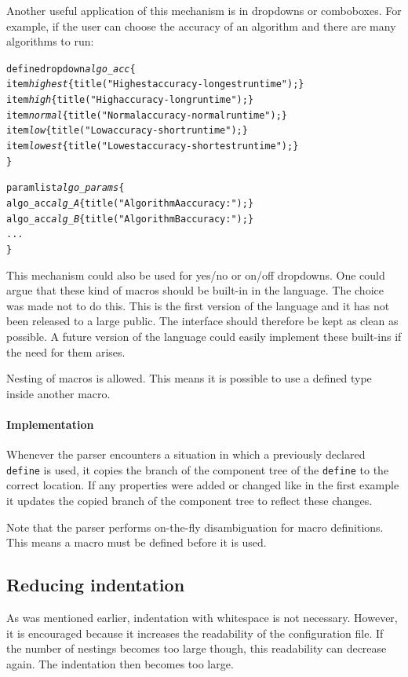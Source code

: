 \bigskip \noindent
Another useful application of this mechanism is in dropdowns or comboboxes. For
example, if the user can choose the accuracy of an algorithm and there are many
algorithms to run:
\begin{alltt}
define dropdown \emph{algo_acc} \{
    item \emph{highest} \{ title("Highest accuracy - longest runtime"); \}
    item \emph{high}    \{ title("High accuracy - long runtime"); \}
    item \emph{normal}  \{ title("Normal accuracy - normal runtime"); \}
    item \emph{low}     \{ title("Low accuracy - short runtime"); \}
    item \emph{lowest}  \{ title("Lowest accuracy - shortest runtime"); \}
\}

paramlist \emph{algo_params} \{
    algo_acc \emph{alg_A} \{ title("Algorithm A accuracy:"); \}
    algo_acc \emph{alg_B} \{ title("Algorithm B accuracy:"); \}
    ...
\}
\end{alltt}
This mechanism could also be used for yes/no or on/off dropdowns. One could
argue that these kind of macros should be built-in in the language. The choice
was made not to do this. This is the first version of the language and it has not
been released to a large public. The interface should therefore be kept as
clean as possible. A future version of the language could easily implement
these built-ins if the need for them arises.

\bigskip \noindent
Nesting of macros is allowed. This means it is possible to use a defined type
inside another macro.

\bigskip \noindent
\paragraph{Implementation\\ }
\noindent Whenever the parser encounters a situation in which a previously declared
\verb=define= is used, it copies the branch of the component tree of the
\verb=define= to the correct location. If any properties were added or changed
like in the first example it updates the copied branch of the component tree to
reflect these changes.

Note that the parser performs on-the-fly disambiguation for macro definitions.
This means a macro must be defined before it is used.

\subsection{Reducing indentation} \label{sect:language:chopping}
As was mentioned earlier, indentation with whitespace is not necessary. However, it
is encouraged because it increases the readability of the configuration file.
If the number of nestings becomes too large though, this readability can decrease again. The
indentation then becomes too large.

